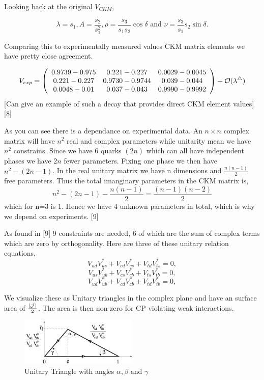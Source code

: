 Looking back at the original $V_{CKM}$,

\[\lambda =s_{1} , A=\frac{s_{2}}{s^{2}_{1}}, \rho =\frac{s_{3}}{s_{1}s_{2}}\cos\delta \mbox{ and } \nu = \frac{s_3}{s_1}{s_2}\sin\delta.\]

Comparing this to experimentally measured values CKM matrix elements we have pretty close agreement.

\[V_{exp} = \left( \begin{array}{ccc} 0.9739-0.975 & 0.221-0.227 & 0.0029-0.0045 \\ 0.221-0.227 & 0.9730-0.9744 & 0.039-0.044 \\ 0.0048-0.01 &  0.037-0.043 & 0.9990-0.9992 \end{array}\right) + \cal{O}(\lambda^4)\]
[Can give an example of such a decay that provides direct CKM element values][8]

 As you can see there is a dependance on experimental data. An $n\times n$ complex matrix will have $n^2$ real and complex parameters while unitarity mean we have $n^2$ constrains. Since we have 6 quarks $(2n)$ which can all have independent phases we have $2n$ fewer parameters. Fixing one phase we then have $n^2 - (2n - 1)$. In the real unitary matrix we have n dimensions and $\frac{n(n-1)}{2}$ free parameters. Thus the total imanginary parameters in the CKM matrix is,
 \[n^2 - (2n - 1)-\frac{n(n-1)}{2} = \frac{(n-1)(n-2)}{2}\]
 which for n=3 is 1. Hence we have 4 unknown parameters in total, which is why we depend on experiments. [9]

As found in [9] 9 constraints are needed, 6 of which are the sum of complex terms which are zero by orthogonality. Here are three of these unitary relation equations, 
\[V_{ud}V^{*}_{us}+V_{cd}V^{*}_{cs}+V_{td}V^{*}_{ts}=0,\]
\[V_{us}V^{*}_{ub}+V_{cs}V^{*}_{cb}+V_{ts}V^{*}_{tb}=0,\]
\[V_{ud}V^{*}_{ub}+V_{cd}V^{*}_{cb}+V_{td}V^{*}_{tb}=0,\]

We visualize these as Unitary triangles in the complex plane and have an surface area of $\frac{\left|\cal{J}\right|}{2}$. The area is then non-zero for CP violating weak interactions.

\begin{figure}[h]
\centering
\includegraphics[width=0.5\textwidth]{figs/ckmfig5.jpg}
\caption{Unitary Triangle with angles $\alpha, \beta \mbox{ and } \gamma$}
\label{tri4}
\end{figure}

